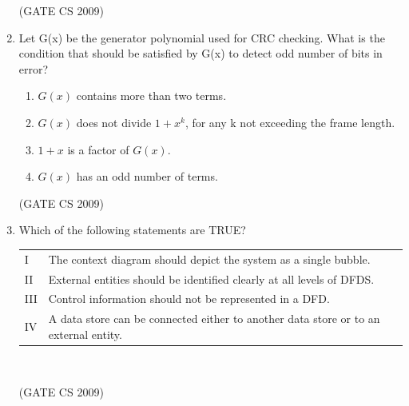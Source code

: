 \documentclass[a4paper, 11pt]{article}
\begin{document}
\begin{enumerate}
    \hfill (GATE CS 2009)

    \item  Let G(x) be the generator polynomial used for CRC checking. What is the condition that should be satisfied by G(x) to detect odd number of bits in error?\\
    \begin{enumerate} 
        \item $G(x)$ contains more than two terms.
        \item $G(x)$ does not divide $1+x^k$, for any k not exceeding the frame length.
        \item $1+x$ is a factor of $G(x)$.
        \item $G(x)$ has an odd number of terms.
    \end{enumerate}
    
    \hfill (GATE CS 2009)

    \item Which of the following statements are TRUE?\\
    \begin{tabular}{ll}
        I & The context diagram should depict the system as a single bubble. \\
        II & External entities should be identified clearly at all levels of DFDS.\\
        III & Control information should not be represented in a DFD.\\
        IV & A data store can be connected either to another data store or to an external entity.\\
    \end{tabular}\\
    
    \begin{enumerate}
    \end{enumerate}
    
    \hfill (GATE CS 2009)


\end{enumerate}
\end{document}
